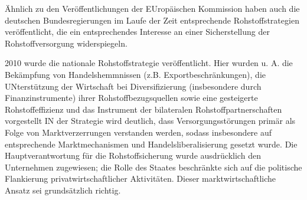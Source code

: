 \documentclass[12pt,a4paper,oneside]{book} %
\begin{document}
Ähnlich zu den Veröffentlichungen der EUropäischen Kommission haben auch die deutschen Bundesregierungen im Laufe der Zeit entsprechende Rohstoffstrategien veröffentlicht, die ein entsprechendes Interesse an einer Sicherstellung der Rohstoffversorgung widerspiegeln.

2010 wurde die nationale Rohstoffstrategie veröffentlicht.\autocite{Rohstoffstrategie der Bundesregierung. Sicherung einer nachhaltigen Rohstoffversorgung Deutschlands} Hier wurden u. A. die Bekämpfung von Handelshemmnissen (z.B. Exportbeschränkungen), die UNterstützung der Wirtschaft bei Diversifizierung (insbesondere durch Finanzinstrumente) ihrer Rohstoffbezugsquellen sowie eine gesteigerte Rohstoffeffizienz und das Instrument der bilateralen Rohstoffpartnerschaften vorgestellt
IN der Strategie wird deutlich, dass Versorgungsstörungen primär als Folge von Marktverzerrungen verstanden werden, sodass insbesondere auf entsprechende Marktmechanismen und Handelsliberalisierung gesetzt wurde. Die Hauptverantwortung für die Rohstoffsicherung wurde ausdrücklich den Unternehmen zugewiesen; die Rolle des Staates beschränkte sich auf die politische Flankierung privatwirtschaftlicher Aktivitäten. Dieser marktwirtschaftliche Ansatz sei grundsätzlich richtig.\autocite{Frenz 2025, S.312}
\end{document}
